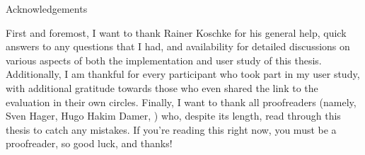 \documentclass[%
	paper=A4,
	twoside=true,
	openright,
	parskip=half,           %
  11pt,
	chapterprefix=true,     %
	headings=normal,        %
	bibliography=totocnumbered,     %
	titlepage=on,           %
	captions=tableabove,    %
]{scrbook}
\newcommand*\letterfamily{\usefont{U}{RoyalIn}{xl}{n}}
\renewcommand{\ctchapternumber}[1]{%
    \usekomafont{chapter}%
    \begin{minipage}[t]{0.3\textwidth}%
        \raggedleft{%
            {\color{ctcolorchapterline}\rule[-5pt]{2pt}{5cm}}%
            \quad%
            {\color{ctcolorchapternum}\fontsize{60}{60}\selectfont#1}%
        }%
    \end{minipage}}
\begin{document}
{Acknowledgements}

First and foremost, I want to thank Rainer Koschke for his general help, quick answers to any questions that I had, and availability for detailed discussions on various aspects of both the implementation and user study of this thesis.
Additionally, I am thankful for every participant who took part in my user study, with additional gratitude towards those who even shared the link to the evaluation in their own circles.
Finally, I want to thank all proofreaders (namely, Sven Hager, Hugo Hakim Damer, ) who, despite its length, read through this thesis to catch any mistakes.
If you're reading this right now, you must be a proofreader, so good luck, and thanks!

\cleardoublepage

{
	\hypersetup{hidelinks}
	\tableofcontents
}
\cleardoublepage

\mainmatter












\cleardoublepage{}

\appendix


\makeatletter
\renewcommand\listoffigures{%
	\chapter{\listfigurename}
	\@starttoc{lof}%
}
\makeatother

\makeatletter
\renewcommand\listoftables{%
	\chapter{\listtablename}
	\@starttoc{lot}%
}
\makeatother
\end{document}
